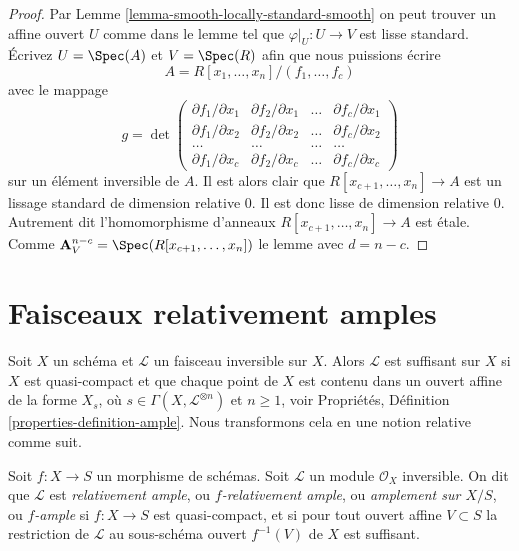 \begin{proof}
Par
Lemme \ref{lemma-smooth-locally-standard-smooth} on peut trouver un affine
ouvert $U$ comme dans le lemme tel que $\varphi|_U : U \to V$
est lisse standard. Écrivez $U = \Spec(A)$
et $V = \Spec(R)$ afin que nous puissions écrire
$$
A = R[x_1, \ldots, x_n]/(f_1, \ldots, f_c)
$$
avec le mappage
$$
g =
\det
\left(
\begin{matrix}
\partial f_1/\partial x_1 &
\partial f_2/\partial x_1 &
\ldots &
\partial f_c/\partial x_1 \\
\partial f_1/\partial x_2 &
\partial f_2/\partial x_2 &
\ldots &
\partial f_c/\partial x_2 \\
\ldots & \ldots & \ldots & \ldots \\
\partial f_1/\partial x_c &
\partial f_2/\partial x_c &
\ldots &
\partial f_c/\partial x_c
\end{matrix}
\right)
$$
sur un élément inversible de $A$. Il est alors
clair que $R[x_{c + 1}, \ldots, x_n] \to A$ est un lissage standard de dimension
relative $0$. Il est donc lisse de dimension
relative $0$. Autrement dit l'homomorphisme
d'anneaux $R[x_{c + 1}, \ldots, x_n] \to A$ est étale. Comme $\mathbf{A}^{n - c}_V = \Spec(R[x_{c + 1}, \ldots, x_n])$ le
lemme avec $d = n - c$.
\end{proof}
















\section{Faisceaux relativement amples}
\label{section-relatively-ample}

\noindent
Soit $X$ un schéma et $\mathcal{L}$ un faisceau inversible sur
$X$. Alors $\mathcal{L}$ est suffisant sur $X$ si $X$
est quasi-compact et que chaque point de $X$ est
contenu dans un ouvert affine de la forme $X_s$, où $s \in \Gamma(X, \mathcal{L}^{\otimes n})$ et $n \geq 1$,
voir Propriétés, Définition \ref{properties-definition-ample}. Nous transformons
cela en une notion relative comme suit.

\begin{definition}
\label{definition-relatively-ample}
\begin{reference}
\cite[II Définition 4.6.1]{EGA}
\end{reference}
Soit $f : X \to S$ un morphisme de schémas. Soit $\mathcal{L}$ un
module $\mathcal{O}_X$ inversible. On dit que $\mathcal{L}$ est {\it
relativement ample}, ou {\it $f$-relativement ample}, ou {\it
amplement sur $X/S$}, ou {\it $f$-ample}
si $f : X \to S$ est quasi-compact, et si pour tout ouvert
affine $V \subset S$ la restriction de $\mathcal{L}$ au sous-schéma ouvert $f^{-1}(V)$
de $X$ est suffisant.
\end{definition}

